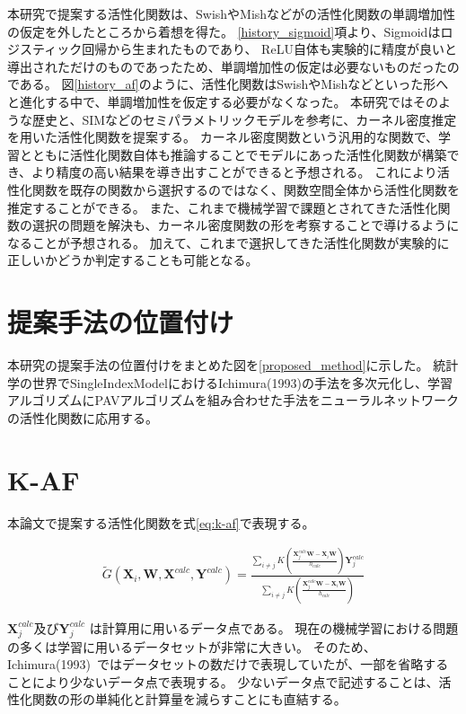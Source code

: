 本研究で提案する活性化関数は、SwishやMishなどがの活性化関数の単調増加性の仮定を外したところから着想を得た。
\ref{history_sigmoid}項より、Sigmoidはロジスティック回帰から生まれたものであり、
ReLU自体も実験的に精度が良いと導出されただけのものであったため、単調増加性の仮定は必要ないものだったのである。
図\ref{history_af}のように、活性化関数はSwishやMishなどといった形へと進化する中で、単調増加性を仮定する必要がなくなった。
本研究ではそのような歴史と、SIMなどのセミパラメトリックモデルを参考に、カーネル密度推定を用いた活性化関数を提案する。
カーネル密度関数という汎用的な関数で、学習とともに活性化関数自体も推論することでモデルにあった活性化関数が構築でき、より精度の高い結果を導き出すことができると予想される。
これにより活性化関数を既存の関数から選択するのではなく、関数空間全体から活性化関数を推定することができる。
また、これまで機械学習で課題とされてきた活性化関数の選択の問題を解決も、カーネル密度関数の形を考察することで導けるようになることが予想される。
加えて、これまで選択してきた活性化関数が実験的に正しいかどうか判定することも可能となる。



\section{提案手法の位置付け}
\label {position_proposed}

本研究の提案手法の位置付けをまとめた図を\ref{proposed_method}に示した。
統計学の世界でSingleIndexModelにおけるIchimura(1993)の手法を多次元化し、学習アルゴリズムにPAVアルゴリズムを組み合わせた手法をニューラルネットワークの活性化関数に応用する。



\section{K-AF}
\label {math}
本論文で提案する活性化関数を式\ref{eq:k-af}で表現する。

\begin{eqnarray}
\tilde{G}(\mathbf{X}_i, \mathbf{W}, \mathbf{X}^{calc}, \mathbf{Y}^{calc})=\frac{\sum_{i\neq j} K\left(\frac{\mathbf{X}^{calc}_j \mathbf{W} - \mathbf{X}_i \mathbf{W}}{h_{calc}}\right)\mathbf{Y}^{calc}_j}{\sum_{i\neq j} K\left(\frac{\mathbf{X}^{calc}_j \mathbf{W} - \mathbf{X}_i \mathbf{W}}{h_{calc}}\right)}
\label{eq:k-af}
\end{eqnarray}


$ \mathbf{X}^{calc}_j $及び$ \mathbf{Y}^{calc}_j $ は計算用に用いるデータ点である。
現在の機械学習における問題の多くは学習に用いるデータセットが非常に大きい。
そのため、Ichimura(1993)~\cite{ichimura}ではデータセットの数だけで表現していたが、一部を省略することにより少ないデータ点で表現する。
少ないデータ点で記述することは、活性化関数の形の単純化と計算量を減らすことにも直結する。


